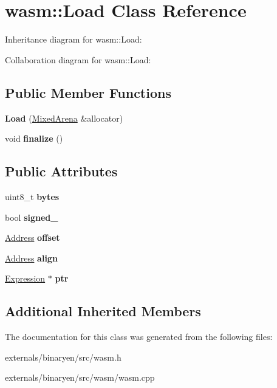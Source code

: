 \hypertarget{classwasm_1_1_load}{}\section{wasm\+:\+:Load Class Reference}
\label{classwasm_1_1_load}


Inheritance diagram for wasm\+:\+:Load\+:


Collaboration diagram for wasm\+:\+:Load\+:
\subsection*{Public Member Functions}
\begin{DoxyCompactItemize}
\item 
\mbox{\label{classwasm_1_1_load_a83d329751d6cd3f3fba9d549556857d0}} 
{\bfseries Load} (\mbox{\hyperlink{struct_mixed_arena}{Mixed\+Arena}} \&allocator)
\item 
\mbox{\label{classwasm_1_1_load_af00397edc635eaac3b874246df60813b}} 
void {\bfseries finalize} ()
\end{DoxyCompactItemize}
\subsection*{Public Attributes}
\begin{DoxyCompactItemize}
\item 
\mbox{\label{classwasm_1_1_load_ad7f12b77b191594646921291f7e634f8}} 
uint8\+\_\+t {\bfseries bytes}
\item 
\mbox{\label{classwasm_1_1_load_ad39736f028708b7a1993c971a1a467ee}} 
bool {\bfseries signed\+\_\+}
\item 
\mbox{\label{classwasm_1_1_load_ad0793d204ae210b35982fad1e65b3098}} 
\mbox{\hyperlink{structwasm_1_1_address}{Address}} {\bfseries offset}
\item 
\mbox{\label{classwasm_1_1_load_ad992193fbf8172df0f8f700c014ca040}} 
\mbox{\hyperlink{structwasm_1_1_address}{Address}} {\bfseries align}
\item 
\mbox{\label{classwasm_1_1_load_ae0bd7c3ef60b34e3ec1eb0951ebc3d67}} 
\mbox{\hyperlink{classwasm_1_1_expression}{Expression}} $\ast$ {\bfseries ptr}
\end{DoxyCompactItemize}
\subsection*{Additional Inherited Members}


The documentation for this class was generated from the following files\+:\begin{DoxyCompactItemize}
\item 
externals/binaryen/src/wasm.\+h\item 
externals/binaryen/src/wasm/wasm.\+cpp\end{DoxyCompactItemize}
